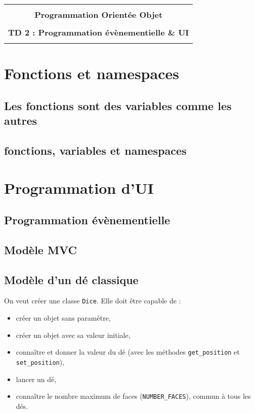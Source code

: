 \documentclass[12pt]{article}
\begin{document}
    \begin{center}
      \begin{tabular}{c}
      \hline
    \\
        {\bf \textsf {\Large Programmation Orientée Objet}}\\
    \\
        {\bf \textsf {\Large TD 2 : Programmation évènementielle \& UI}}\\
    \\
        \hline
      \end{tabular}
    \end{center}
    \vspace{15mm}

\section{Fonctions et namespaces}

\subsection{Les fonctions sont des variables comme les autres}

\subsection{fonctions, variables et namespaces}

\section{Programmation d'UI}

\subsection{Programmation évènementielle}

\subsection{Modèle MVC}


\subsection{Modèle d'un dé classique}

On veut créer une classe \verb|Dice|. Elle doit être capable de :
\begin{itemize}
	\item créer un objet sans paramètre,
	\item créer un objet avec sa valeur initiale,
	\item connaître et donner la valeur du dé (avec les méthodes \verb|get_position| et \verb|set_position|),
	\item lancer un dé,
	\item connaître le nombre maximum de faces (\verb|NUMBER_FACES|), commun à tous les dés.
\end{itemize}
\end{document}
